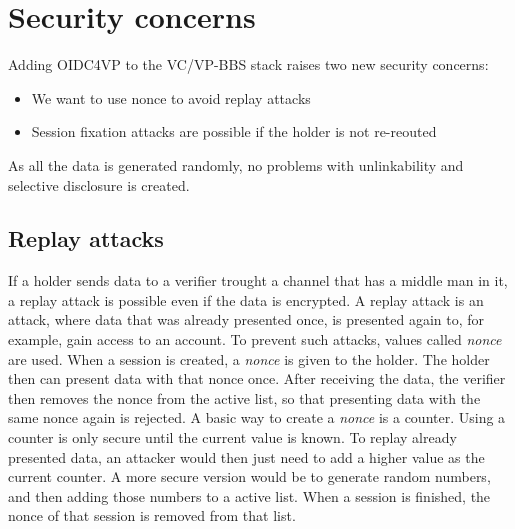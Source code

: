 \documentclass[
	a4paper               %
	,BCOR=0mm            %
	,bibliography=totoc   %
	,listof=totoc         %
	,monolingual
	,twoside=false
]{bfhthesis}              %
\begin{document}
\section{Security concerns}
Adding OIDC4VP to the VC/VP-BBS stack raises two new security concerns:
\begin{itemize}
	\item We want to use nonce to avoid replay attacks
	\item Session fixation attacks are possible if the holder is not re-reouted
\end{itemize}
As all the data is generated randomly, no problems with unlinkability and selective disclosure is created.

\subsection{Replay attacks}
If a holder sends data to a verifier trought a channel that has a middle man in it, a replay attack is possible even if the data is encrypted.
A replay attack is an attack, where data that was already presented once, is presented again to, for example, gain access to an account.
To prevent such attacks, values called \textit{nonce} are used. When a session is created, a \textit{nonce} is given to the holder.
The holder then can present data with that nonce once. After receiving the data, the verifier then removes the nonce from the active list, so that presenting data with the same nonce again is rejected.
A basic way to create a \textit{nonce} is a counter. Using a counter is only secure until the current value is known. To replay already presented data, an attacker would then just need to add a higher value as the current counter.
A more secure version would be to generate random numbers, and then adding those numbers to a active list. When a session is finished, the nonce of that session is removed from that list.
\end{document}
